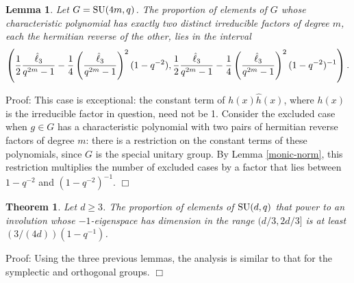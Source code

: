 \documentclass[12pt]{article}
\newtheorem{lemma}[definition]{Lemma}
\newtheorem{theorem}[definition]{Theorem}
\newenvironment{proof}{\normalsize {\sc Proof}:}{{\hfill $\Box$ \\}}
\def\SU{{\rm SU}}
\begin{document}
\begin{lemma}\label{Unitaryc}
Let $G=\SU(4m,q)$.
The proportion of elements of $G$ whose characteristic polynomial
has exactly two distinct irreducible factors of degree $m$, each the 
hermitian reverse of the other, lies in the interval 
$$\left({1\over2}{\hat{\ell}_3\over q^{2m}-1} - 
{1\over4}\left({\hat{\ell}_3\over q^{2m}-1}\right)^2(1-q^{-2}),
{1\over2}{\hat{\ell}_3\over q^{2m}-1} - 
{1\over4}\left({\hat{\ell}_3\over q^{2m}-1}\right)^2(1-q^{-2})^{-1}\right).$$
\end{lemma}
\begin{proof}
This case is exceptional:
the constant term of $h(x)\hat{h}(x)$, where $h(x)$
is the irreducible factor in question, need not be 1. 
Consider the excluded case when $g\in G$ has a characteristic 
polynomial with two pairs of hermitian reverse factors
of degree $m$: there is a restriction on the constant terms of 
these polynomials, since $G$ is the special unitary group.
By Lemma \ref{monic-norm}, %
this restriction multiplies the number of excluded cases by a factor that lies
between $1-q^{-2}$ and $(1-q^{-2})^{-1}$.
\end{proof}

\begin{theorem}\label{Theorem5.3} 
Let $d\ge3$. The proportion of elements of 
$\SU(d,q)$ that power to an involution
whose $-1$-eigenspace has dimension in the range
$(d/3,2d/3]$ is at least $(3/(4d))(1 - q^{-1})$.
\end{theorem}
\begin{proof} 
Using the three previous lemmas, the analysis is similar 
to that for the symplectic and orthogonal groups.
\end{proof}
\end{document}
